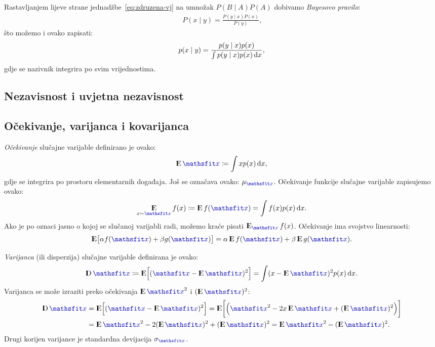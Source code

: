 \documentclass[utf8, diplomski, lmodern]{fer}
\begin{document}
Rastavljanjem lijeve strane jednadžbe~\ref{eq:zdruzena-vj} na umnožak $P(B\mid A)P(A)$ dobivamo \emph{Bayesovo pravilo}:
\begin{align}
P(x\mid y) = \frac{P(y\mid x)P(x)}{P(y)} \text{,}
\end{align}
što možemo i ovako zapisati:
\begin{align}
p(x\mid y) = \frac{p(y\mid x)p(x)}{\int p(y\mid x)p(x)\dif x} \text{,}
\end{align}
gdje se nazivnik integrira po svim vrijednostima.

\subsection{Nezavisnost i uvjetna nezavisnost}

\subsection{Očekivanje, varijanca i kovarijanca}

\emph{Očekivanje} slučajne varijable definirano je ovako:
\begin{align}
\E\rvar x \coloneqq \int xp(x)\dif x,
\end{align}
gdje se integrira po prostoru elementarnih događaja. Još se označava ovako: $\mu_{\rvar x}$. Očekivanje funkcije slučajne varijable zapisujemo ovako:
\begin{align}
\E_{x\sim\rvar x} f(x) \coloneqq \E f(\rvar x) = \int f(x)p(x)\dif x \text{.}
\end{align}
Ako je po oznaci jasno o kojoj se slučanoj varijabli radi, možemo kraće pisati $\E_{\rvar x} f(x)$. Očekivanje ima svojstvo linearnosti:
\begin{align}
\E\sbr{\alpha f(\rvar x)+\beta g(\rvar x)} = \alpha\E f(\rvar x)+\beta\E g(\rvar x) \text{.}
\end{align}

\emph{Varijanca} (ili disperzija) slučajne varijable definirana je ovako:
\begin{align}
\D\rvar x \coloneqq \E\sbr{\del{\rvar x-\E \rvar x}^2} = \int (x-\E \rvar x)^2 p(x)\dif x  \text{.}
\end{align}
Varijanca se može izraziti preko očekivanja $\E{\rvar x}^2$ i $\del{\E\rvar x}^2$:
\begin{align}
\D\rvar x 
&= \E\sbr{\del{\rvar x-\E \rvar x}^2} = \E\sbr{\del{{\rvar x}^2-2x\E \rvar x+\del{\E\rvar x}^2}} \\
&= \E{\rvar x}^2-2\del{\E\rvar x}^2+\del{\E\rvar x}^2 = \E{\rvar x}^2 - \del{\E\rvar x}^2  \text{.}
\end{align}
Drugi korijen varijance je standardna devijacija $\sigma_{\rvar x}$.
\end{document}
